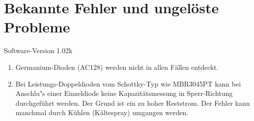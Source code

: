 
\chapter{Bekannte Fehler und ungelöste Probleme}
{\center Software-Version 1.02k}

\begin{enumerate}

\item Germanium-Dioden (AC128) werden nicht in allen Fällen entdeckt.
\item Bei Leistungs-Doppeldioden vom Schottky-Typ wie MBR3045PT kann bei Anschlu"s einer Einzeldiode keine Kapazitätsmessung in Sperr-Richtung 
durchgeführt werden. Der Grund ist ein zu hoher Reststrom. Der Fehler kann manchmal durch Kühlen (Kältespray) umgangen werden.

\end{enumerate}
